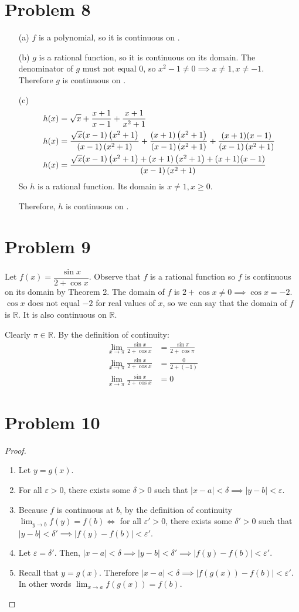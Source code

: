 \documentclass{article}
\newcommand*{\paren}[1]{\ensuremath\left(#1\right)}
\newcommand*{\problem}[1]{\section*{Problem #1}}
\newcommand*{\limit}[2][x]{\ensuremath{\displaystyle\lim_{#1\to#2}}}
\newcommand*{\abs}[1]{\ensuremath{\left|#1\right|}}
\newcommand*{\eps}{\varepsilon}
\begin{document}
\problem{8}
\begin{itemize}
	\item[(a)] $f$ is a polynomial, so it is continuous on .
	\item[(b)] $g$ is a rational function, so it is continuous on its domain. The denominator of $g$ must not equal $0$, so $x^2-1\neq0\implies x\neq1,x\neq-1$. Therefore $g$ is continuous on .
	\item[(c)]
	\begin{align*}
		h(x)&=\sqrt{x}+\frac{x+1}{x-1}+\frac{x+1}{x^2+1} \\
		h(x)&=\frac{\sqrt{x}(x-1)\paren{x^2+1}}{(x-1)\paren{x^2+1}}+\frac{(x+1)\paren{x^2+1}}{(x-1)\paren{x^2+1}}+\frac{(x+1)(x-1)}{(x-1)\paren{x^2+1}} \\
		h(x)&=\frac{\sqrt{x}(x-1)\paren{x^2+1}+(x+1)\paren{x^2+1}+(x+1)(x-1)}{(x-1)\paren{x^2+1}}
	\end{align*}
	So $h$ is a rational function. Its domain is $x\neq1,x\geq0$.
	
	Therefore, $h$ is continuous on .
\end{itemize}

\problem{9}
Let $f(x)=\dfrac{\sin x}{2+\cos x}$. Observe that $f$ is a rational function so $f$ is continuous on its domain by Theorem 2. The domain of $f$ is $2+\cos x\neq0\implies\cos x=-2$. $\cos x$ does not equal $-2$ for real values of $x$, so we can say that the domain of $f$ is $\mathbb{R}$. It is also continuous on $\mathbb{R}$.

Clearly $\pi\in\mathbb{R}$. By the definition of continuity:
\begin{align*}
	\limit{\pi}\frac{\sin x}{2+\cos x}&=\frac{\sin\pi}{2+\cos\pi} \\
	\limit{\pi}\frac{\sin x}{2+\cos x}&=\frac{0}{2+(-1)} \\
	\limit{\pi}\frac{\sin x}{2+\cos x}&=\boxed{0}
\end{align*}

\problem{10}

\begin{proof}
	\begin{enumerate}
		\item Let $y=g(x)$.
		\item For all $\eps>0$, there exists some $\delta>0$ such that $\abs{x-a}<\delta\implies\abs{y-b}<\eps$.
		\item Because $f$ is continuous at $b$, by the definition of continuity $\limit[y]{b}f(y)=f(b)\iff$ for all $\eps'>0$, there exists some $\delta'>0$ such that $\abs{y-b}<\delta'\implies\abs{f(y)-f(b)}<\eps'$.
		\item Let $\eps=\delta'$. Then, $\abs{x-a}<\delta\implies\abs{y-b}<\delta'\implies\abs{f(y)-f(b)}<\eps'$.
		\item Recall that $y=g(x)$. Therefore $\abs{x-a}<\delta\implies\abs{f(g(x))-f(b)}<\eps'$. In other words $\limit{a}f(g(x))=f(b)$.
	\end{enumerate}
\end{proof}
\end{document}
